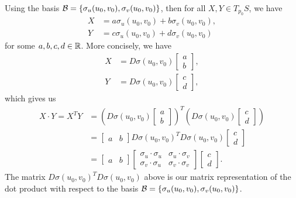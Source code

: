Using the basis ${\cal B} = \{\sigma_u(u_0, v_0), \sigma_v(u_0, v_0)\}$, 
then for all $X, Y \in T_{p_0}S$, we have 
\begin{align*}
    X &= a\sigma_u(u_0, v_0) + b\sigma_v(u_0, v_0), \\ 
    Y &= c\sigma_u(u_0, v_0) + d\sigma_v(u_0, v_0)
\end{align*}
for some $a, b, c, d \in \mathbb{R}$. More concisely, we have 
\begin{align*}
    X &= D\sigma(u_0, v_0) \begin{bmatrix}
        a \\ b 
    \end{bmatrix}, \\
    Y &= D\sigma(u_0, v_0) \begin{bmatrix}
        c \\ d  
    \end{bmatrix},
\end{align*}
which gives us 
\begin{align*}
    X \cdot Y = X^T Y 
    &= \left( D\sigma(u_0, v_0) \begin{bmatrix}
        a \\ b 
    \end{bmatrix} \right)^{\!T} \left( D\sigma(u_0, v_0) \begin{bmatrix}
        c \\ d  
    \end{bmatrix} \right) \\ 
    &= \begin{bmatrix}
        a & b 
    \end{bmatrix} D\sigma(u_0, v_0)^T D\sigma(u_0, v_0) \begin{bmatrix}
        c \\ d
    \end{bmatrix} \\ 
    &= \begin{bmatrix}
        a & b 
    \end{bmatrix} \begin{bmatrix} 
        \sigma_u \cdot \sigma_u & \sigma_u \cdot \sigma_v \\ 
        \sigma_v \cdot \sigma_u & \sigma_v \cdot \sigma_v 
    \end{bmatrix} \begin{bmatrix}
        c \\ d
    \end{bmatrix}.
\end{align*}
The matrix $D\sigma(u_0, v_0)^T D\sigma(u_0, v_0)$ above is our matrix representation 
of the dot product with respect to the basis ${\cal B} = \{\sigma_u(u_0, v_0), 
\sigma_v(u_0, v_0)\}$. 


